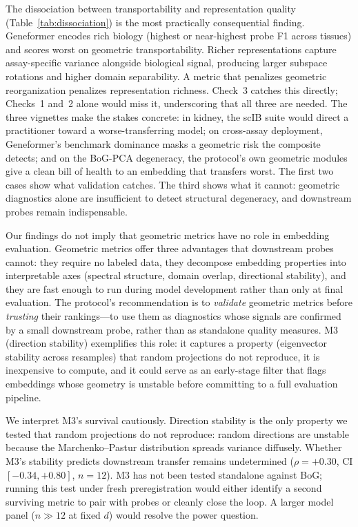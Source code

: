 \documentclass[10pt,letterpaper]{article}
\begin{document}
The dissociation between transportability and representation quality (Table~\ref{tab:dissociation}) is the most practically consequential finding. Geneformer encodes rich biology (highest or near-highest probe F1 across tissues) and scores worst on geometric transportability. Richer representations capture assay-specific variance alongside biological signal, producing larger subspace rotations and higher domain separability. A metric that penalizes geometric reorganization penalizes representation richness. Check~3 catches this directly; Checks~1 and~2 alone would miss it, underscoring that all three are needed. The three vignettes make the stakes concrete: in kidney, the scIB suite would direct a practitioner toward a worse-transferring model; on cross-assay deployment, Geneformer's benchmark dominance masks a geometric risk the composite detects; and on the BoG-PCA degeneracy, the protocol's own geometric modules give a clean bill of health to an embedding that transfers worst. The first two cases show what validation catches. The third shows what it cannot: geometric diagnostics alone are insufficient to detect structural degeneracy, and downstream probes remain indispensable.

Our findings do not imply that geometric metrics have no role in embedding evaluation. Geometric metrics offer three advantages that downstream probes cannot: they require no labeled data, they decompose embedding properties into interpretable axes (spectral structure, domain overlap, directional stability), and they are fast enough to run during model development rather than only at final evaluation. The protocol's recommendation is to \emph{validate} geometric metrics before \emph{trusting} their rankings---to use them as diagnostics whose signals are confirmed by a small downstream probe, rather than as standalone quality measures. M3 (direction stability) exemplifies this role: it captures a property (eigenvector stability across resamples) that random projections do not reproduce, it is inexpensive to compute, and it could serve as an early-stage filter that flags embeddings whose geometry is unstable before committing to a full evaluation pipeline.

We interpret M3's survival cautiously. Direction stability is the only property we tested that random projections do not reproduce: random directions are unstable because the Marchenko--Pastur distribution spreads variance diffusely. Whether M3's stability predicts downstream transfer remains undetermined ($\rho = +0.30$, CI $[-0.34, +0.80]$, $n = 12$). M3 has not been tested standalone against BoG; running this test under fresh preregistration would either identify a second surviving metric to pair with probes or cleanly close the loop. A larger model panel ($n \gg 12$ at fixed $d$) would resolve the power question.
\end{document}

